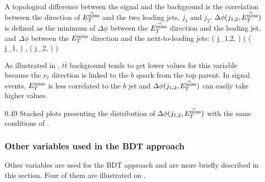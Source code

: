     A topological difference between the signal and the background is the
    correlation between the direction of $\vec{E_T^\text{miss}}$ and the two leading jets,
    $j_1$ and $j_2$.  $\Delta \phi( j_{1,2}, \vec{E_T^\text{miss}} )$ is defined as the
    minimum of $\Delta \phi$ between the $\vec{E_T^\text{miss}}$ direction and the leading
    jet, and $\Delta \phi$ between the $E_T^\text{miss}$ direction and the next-to-leading
    jets:
    {
        \Delta \phi( j_{1,2}, \vec{\MET} )
        (
            \Delta \phi( j_1, \vec{\MET} )
            ,
            \Delta \phi( j_2, \vec{\MET} )
        )
    }

    As illustrated in , $t\bar{t}$
    background tends to get lower values for this variable because the
    $\nu_{\ell}$ direction is linked to the $b$ quark from the top parent. In
    signal events, $E_T^\text{miss}$ is less correlated to the $b$ jet and $\Delta \phi(
    j_{1,2}, \vec{E_T^\text{miss}} )$ can easily take higher values.

                 {0.49}
                 {Stacked plots presenting the distribution of $\Delta \phi(
                 j_{1,2}, \vec{E_T^\text{miss}} )$ with the same conditions of
                 .}

    \subsubsection{Other variables used in the BDT approach}

    Other variables are used for the BDT approach and are more briefly described
    in this section. Four of them are illustrated on
    .

